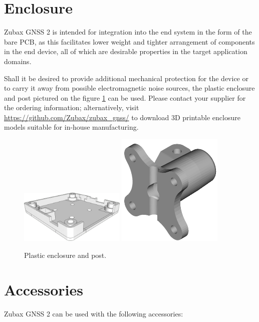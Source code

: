 \documentclass{zubaxdoc}
\begin{document}
\section{Enclosure}\label{sec:enclosure}

Zubax GNSS 2 is intended for integration into the end system in the form of the bare PCB,
as this facilitates lower weight and tighter arrangement of components
in the end device, all of which are desirable properties in the target application domains.

Shall it be desired to provide additional mechanical protection for the device or to carry it away from possible electromagnetic noise sources, the plastic enclosure and post pictured on the figure \ref{enclosure} can be used.
Please contact your supplier for the ordering information;
alternatively, visit \url{https://github.com/Zubax/zubax_gnss/} to download
3D printable enclosure models suitable for in-house manufacturing.

\begin{figure}[hb]
	\centering
	\includegraphics[width=0.45\textwidth]{housing}
	\includegraphics[width=0.45\textwidth]{post}
	\caption{Plastic enclosure and post.\label{enclosure}}
\end{figure}

\section{Accessories}

Zubax GNSS 2 can be used with the following accessories:
\end{document}

